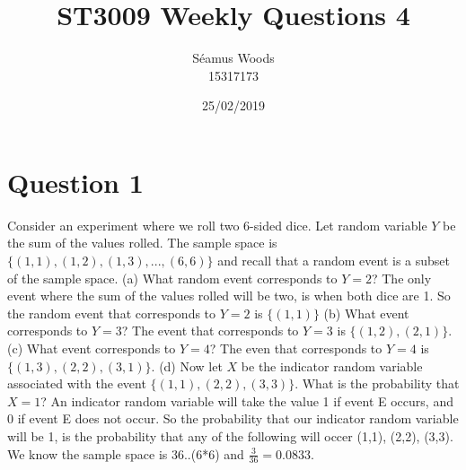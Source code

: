 \documentclass[12pt]{report}
\title{ST3009 Weekly Questions 4}
\author{Séamus Woods \\ 15317173}
\date{25/02/2019}
\begin{document}
\maketitle
\newpage

\section{Question 1}
Consider an experiment where we roll two 6-sided dice. Let random variable $Y$ be the sum of the values rolled. The sample space is $\{(1,1),(1,2),(1,3),...,(6,6)\}$ and recall that a random event is a subset of the sample space.
\newline
\newline
(a) What random event corresponds to $Y = 2$?
\newline
The only event where the sum of the values rolled will be two, is when both dice are 1. So the random event that corresponds to $Y = 2$ is $\{(1,1)\}$
\newline
\newline
(b) What event corresponds to $Y = 3$?
\newline
The event that corresponds to $Y = 3$ is $\{(1,2),(2,1)\}$.
\newline
\newline
(c) What event corresponds to $Y = 4$?
\newline
The even that corresponds to $Y = 4$ is $\{(1,3),(2,2),(3,1)\}$.
\newline
\newline
(d) Now let $X$ be the indicator random variable associated with the event $\{(1,1),(2,2),(3,3)\}$. What is the probability that $X = 1$?
\newline
An indicator random variable will take the value 1 if event E occurs, and 0 if event E does not occur. So the probability that our indicator random variable will be 1, is the probability that any of the following will occer (1,1), (2,2), (3,3). We know the sample space is 36..(6*6) and $\frac{3}{36} = 0.0833$.
\end{document}
